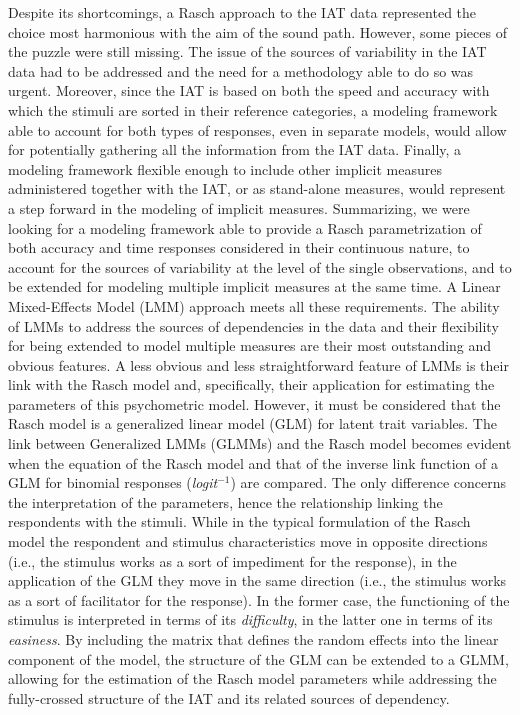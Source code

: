 \documentclass[12pt]{book}
\begin{document}
Despite its shortcomings, a Rasch approach to the IAT data represented the choice  most harmonious with the aim of the sound path. 
However, some pieces of the puzzle were still missing.
The issue of the sources of variability in the IAT data had to be addressed and the need for a methodology able to do so was urgent.
Moreover, since the IAT is based on both the speed and accuracy with which the stimuli are sorted in their reference categories, a modeling framework able to account for both types of responses, even in separate models, would allow for potentially gathering  all the information from the IAT data.
Finally, a modeling framework flexible enough to include other implicit measures administered together with the IAT, or as stand-alone measures, would represent a step forward in the modeling of implicit measures. 
Summarizing, we were looking for a modeling framework able to provide a Rasch parametrization of both accuracy and time responses considered in their continuous nature, to account for the sources of variability at the level of the single observations, and to be extended for modeling multiple implicit measures at the same time.
A Linear Mixed-Effects Model (LMM) approach meets all these requirements.
The ability of LMMs to address the sources of dependencies in the data and their flexibility for being extended to model multiple measures are their most outstanding and obvious features.   
A less obvious and less straightforward feature of LMMs is their link with the Rasch model and, specifically, their application for estimating the parameters of this psychometric model.
However, it must be considered that the Rasch model is a generalized linear model (GLM) for latent trait variables. 
	The link between Generalized LMMs (GLMMs) and the Rasch model becomes evident when the equation of the Rasch model and that of the inverse link function of a GLM for binomial responses (\emph{logit}$^{-1}$) are compared.
The only difference concerns the interpretation of the parameters, hence the relationship linking the respondents with the stimuli. 
While in the typical formulation of the Rasch model the respondent and stimulus characteristics move in opposite directions (i.e., the stimulus works as a sort of impediment for the response), in the application of the GLM they move in the same direction (i.e., the stimulus works as a sort of facilitator for the response). In the former case, the functioning of the stimulus is interpreted in terms of its \emph{difficulty}, in the latter one in terms of its \emph{easiness}.
By including the matrix that defines the random effects into the linear component of the model, the structure of the GLM can be extended to a GLMM, allowing for the estimation of the Rasch model parameters while addressing the fully-crossed structure of the IAT and its related sources of dependency.
\end{document}
